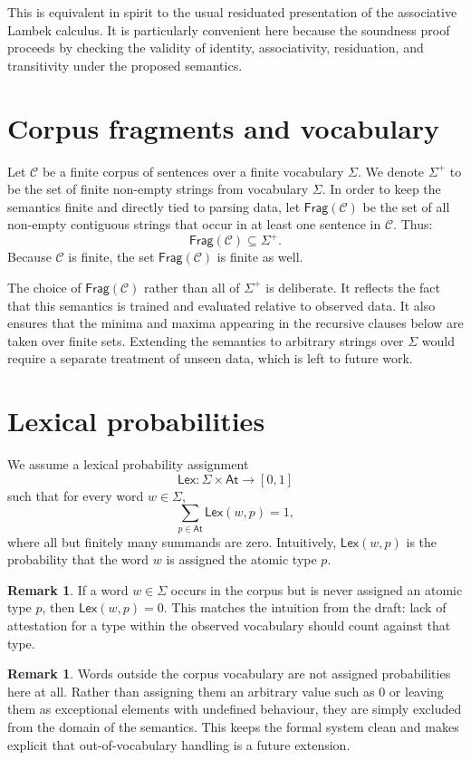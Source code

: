 \documentclass[12pt,a4paper]{report}
\theoremstyle{definition}
\newtheorem{remark}[theorem]{Remark}
\newcommand{\At}{\mathsf{At}}
\newcommand{\Frag}{\mathsf{Frag}}
\newcommand{\Lex}{\mathsf{Lex}}
\begin{document}
This is equivalent in spirit to the usual residuated presentation of the associative Lambek
calculus. It is particularly convenient here because the soundness proof proceeds by checking the
validity of identity, associativity, residuation, and transitivity under the proposed semantics.

\section{Corpus fragments and vocabulary}
Let $\mathcal C$ be a finite corpus of sentences over a finite vocabulary $\Sigma$. We denote $\Sigma^+$ to be the set of finite non-empty strings from vocabulary $\Sigma$. In order to keep the
semantics finite and directly tied to parsing data, let $\Frag(\mathcal C)$ be the set of all non-empty
contiguous strings that occur in at least one sentence in $\mathcal C$. Thus:
\[
\Frag(\mathcal C) \subseteq \Sigma^+.
\]
Because $\mathcal C$ is finite, the set $\Frag(\mathcal C)$ is finite as well.

The choice of $\Frag(\mathcal C)$ rather than all of $\Sigma^+$ is deliberate. It reflects the fact that
this semantics is trained and evaluated relative to observed data. It also ensures that the minima
and maxima appearing in the recursive clauses below are taken over finite sets. Extending the
semantics to arbitrary strings over $\Sigma$ would require a separate treatment of unseen data,
which is left to future work.

\section{Lexical probabilities}
We assume a lexical probability assignment
\[
\Lex : \Sigma \times \At \to [0,1]
\]
such that for every word $w \in \Sigma$,
\[
\sum_{p \in \At} \Lex(w,p) = 1,
\]
where all but finitely many summands are zero. Intuitively, $\Lex(w,p)$ is the probability that
the word $w$ is assigned the atomic type $p$.

\begin{remark}
If a word $w \in \Sigma$ occurs in the corpus but is never assigned an atomic type $p$, then
$\Lex(w,p)=0$. This matches the intuition from the draft: lack of attestation for a type within
the observed vocabulary should count against that type.
\end{remark}

\begin{remark}
Words outside the corpus vocabulary are not assigned probabilities here at all. Rather than
assigning them an arbitrary value such as $0$ or leaving them as exceptional elements with
undefined behaviour, they are simply excluded from the domain of the semantics. This keeps the
formal system clean and makes explicit that out-of-vocabulary handling is a future extension.
\end{remark}
\end{document}
